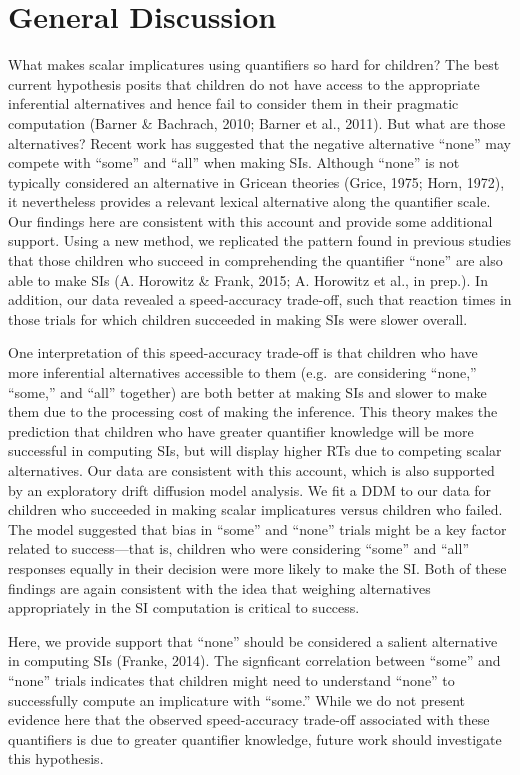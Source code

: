 \documentclass[10pt, letterpaper]{article}
\begin{document}
\section{General Discussion}\label{general-discussion}

What makes scalar implicatures using quantifiers so hard for children?
The best current hypothesis posits that children do not have access to
the appropriate inferential alternatives and hence fail to consider them
in their pragmatic computation (Barner \& Bachrach, 2010; Barner et al.,
2011). But what are those alternatives? Recent work has suggested that
the negative alternative ``none'' may compete with ``some'' and ``all''
when making SIs. Although ``none'' is not typically considered an
alternative in Gricean theories (Grice, 1975; Horn, 1972), it
nevertheless provides a relevant lexical alternative along the
quantifier scale. Our findings here are consistent with this account and
provide some additional support. Using a new method, we replicated the
pattern found in previous studies that those children who succeed in
comprehending the quantifier ``none'' are also able to make SIs (A.
Horowitz \& Frank, 2015; A. Horowitz et al., in prep.). In addition, our
data revealed a speed-accuracy trade-off, such that reaction times in
those trials for which children succeeded in making SIs were slower
overall.

One interpretation of this speed-accuracy trade-off is that children who
have more inferential alternatives accessible to them (e.g.~are
considering ``none,'' ``some,'' and ``all'' together) are both better at
making SIs and slower to make them due to the processing cost of making
the inference. This theory makes the prediction that children who have
greater quantifier knowledge will be more successful in computing SIs,
but will display higher RTs due to competing scalar alternatives. Our
data are consistent with this account, which is also supported by an
exploratory drift diffusion model analysis. We fit a DDM to our data for
children who succeeded in making scalar implicatures versus children who
failed. The model suggested that bias in ``some'' and ``none'' trials
might be a key factor related to success---that is, children who were
considering ``some'' and ``all'' responses equally in their decision
were more likely to make the SI. Both of these findings are again
consistent with the idea that weighing alternatives appropriately in the
SI computation is critical to success.

Here, we provide support that ``none'' should be considered a salient
alternative in computing SIs (Franke, 2014). The signficant correlation
between ``some'' and ``none'' trials indicates that children might need
to understand ``none'' to successfully compute an implicature with
``some.'' While we do not present evidence here that the observed
speed-accuracy trade-off associated with these quantifiers is due to
greater quantifier knowledge, future work should investigate this
hypothesis.
\end{document}
